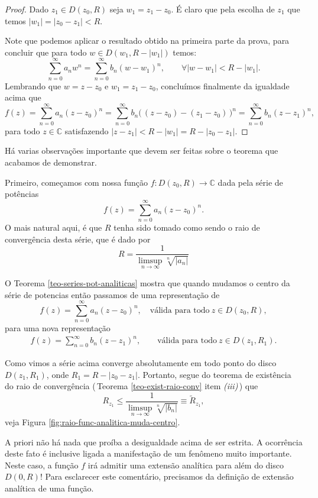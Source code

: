 \begin{proof}
Dado $z_1\in D(z_0,R)$ seja $w_1=z_1-z_0$. É claro que pela escolha
de $z_1$ que temos $|w_1|=|z_0-z_1|<R$.

Note que podemos aplicar o resultado obtido na 
primeira parte da prova, para concluir que 
para todo $w\in D(w_1,R-|w_1|)$ temos:
\[
\sum_{n=0}^{\infty}a_n w^n
=
\sum_{n=0}^{\infty}b_n (w-w_1)^n, \qquad \forall |w-w_1|<R-|w_1|.
\]
Lembrando que $w=z-z_0$ e $w_1=z_1-z_0$, concluímos finalmente da
igualdade acima que 
\[
f(z)
=
\sum_{n=0}^{\infty}a_n (z-z_0)^n
=
\sum_{n=0}^{\infty}b_n \big(\,(z-z_0) -(z_1-z_0)\, \big)^n
=
\sum_{n=0}^{\infty}b_n (z-z_1)^n,
\]
para todo $z\in\mathbb{C}$ satisfazendo $|z-z_1|<R-|w_1|=R-|z_0-z_1|$.
\end{proof}

\bigskip

Há varias observações importante que devem ser feitas sobre o teorema que acabamos
de demonstrar. 


\bigskip 


Primeiro, começamos com nossa função $f:D(z_0,R)\to\mathbb{C}$
dada pela série de potências 
\[
f(z)=\sum_{n=0}^{\infty}a_n(z-z_0)^n.
\]
O mais natural aqui, é que $R$ tenha sido tomado como sendo o raio de convergência 
desta série, que é dado por
\[
R = \frac{1}{\displaystyle\limsup_{n\to\infty} \sqrt[n]{|a_n|}}
\]

O Teorema \ref{teo-series-pot-analiticas} mostra que 
quando mudamos o centro da série de potencias então 
passamos de uma representação de
\[
f(z) = \sum_{n=0}^{\infty}a_n(z-z_0)^n,
\quad \text{válida para todo}\  z\in D(z_0,R),
\] 
para uma nova representação
\begin{align}\label{eq-aux-exe-muda-centro-serie}
f(z) = \sum_{n=0}^{\infty}b_n(z-z_1)^n,
\qquad \text{válida para todo}\ z\in D(z_1,R_1).
\end{align}


Como vimos a série acima converge absolutamente em todo ponto do 
disco $D(z_1,R_1)$, onde $R_1=R-|z_0-z_1|$. Portanto, segue do teorema de existência 
do raio de convergência (\,Teorema \ref{teo-exist-raio-conv} item \textit{(iii)}\,) que
\[
R_{z_1} 
\leqslant 
\frac{1}{\displaystyle\limsup_{n\to\infty} \sqrt[n]{|b_n|}}
\equiv 
\widetilde{R}_{z_1},
\] 
veja Figura \ref{fig:raio-func-analitica-muda-centro}. 

A priori não há nada que proíba a desigualdade acima de ser estrita. 
A ocorrência deste fato é inclusive ligada 
a manifestação de um fenômeno muito importante.
Neste caso, a função $f$ irá admitir uma extensão analítica para além do disco $D(0,R)$!
Para esclarecer este comentário, precisamos 
da definição de extensão analítica de uma função. 


